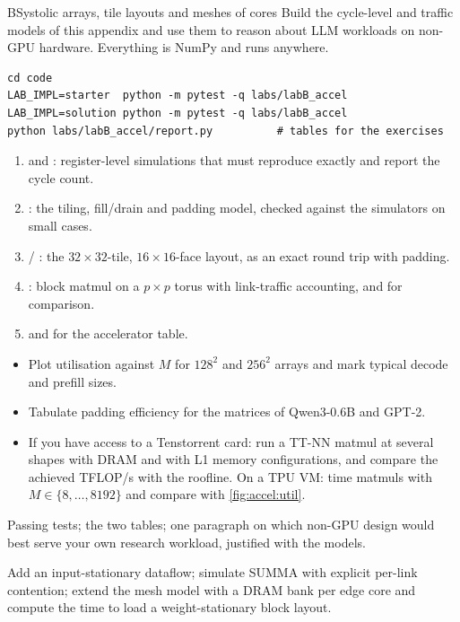 \begin{labbox}{B}{Systolic arrays, tile layouts and meshes of cores}
Build the cycle-level and traffic models of this appendix and use them to reason about LLM
workloads on non-GPU hardware. Everything is NumPy and runs anywhere.

\begin{lstlisting}[style=shell]
cd code
LAB_IMPL=starter  python -m pytest -q labs/labB_accel
LAB_IMPL=solution python -m pytest -q labs/labB_accel
python labs/labB_accel/report.py          # tables for the exercises
\end{lstlisting}

\begin{enumerate}
  \item {} and : register-level
    simulations that must reproduce  exactly and report the cycle count.
  \item {}: the tiling, fill/drain and padding model, checked against
    the simulators on small cases.
  \item {} / : the $32\times32$-tile, $16\times16$-face layout, as an exact
    round trip with padding.
  \item {}: block matmul on a $p\times p$ torus with link-traffic accounting, and
     for comparison.
  \item {} and  for the accelerator table.
\end{enumerate}

\begin{itemize}
  \item Plot utilisation against $M$ for $128^2$ and $256^2$ arrays and mark typical decode and
    prefill sizes.
  \item Tabulate padding efficiency for the matrices of Qwen3-0.6B and GPT-2.
  \item If you have access to a Tenstorrent card: run a TT-NN matmul at
    several shapes with DRAM and with L1 memory configurations, and compare the achieved TFLOP/s with
    the roofline. On a TPU VM: time  matmuls with $M\in\{8,\dots,8192\}$ and compare
    with \cref{fig:accel:util}.
\end{itemize}

Passing tests; the two tables; one paragraph on which non-GPU design would best serve your own
research workload, justified with the models.

Add an input-stationary dataflow; simulate SUMMA with explicit per-link contention; extend the
mesh model with a DRAM bank per edge core and compute the time to load a weight-stationary
block layout.
\end{labbox}
